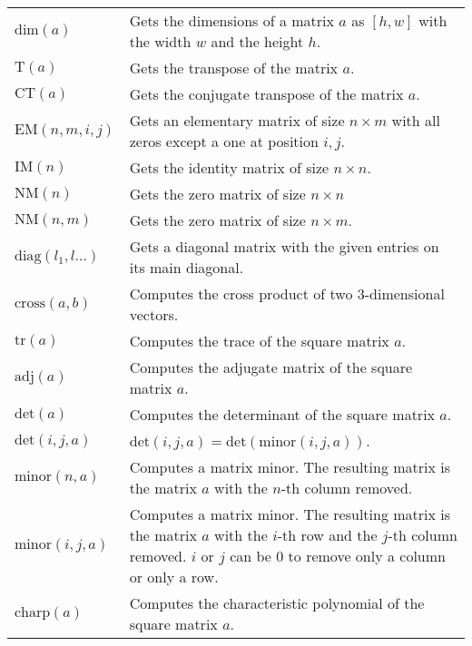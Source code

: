\documentclass[10pt]{article}
\begin{document}
\begin{longtable}{p{}p{}}
        $ \mathrm{dim}(a) $                        & Gets the dimensions of a matrix $ a $ as $ [ h, w ] $ with the width $ w $ and the height $ h $. \\
        $ \mathrm{T}(a) $                          & Gets the transpose of the matrix $ a $. \\
        $ \mathrm{CT}(a) $                         & Gets the conjugate transpose of the matrix $ a $. \\
        $ \mathrm{EM}(n,m,i,j) $                   & Gets an elementary matrix of size $ n \times m $ with all zeros except a one at position $ i, j $. \\
        $ \mathrm{IM}(n) $                         & Gets the identity matrix of size $ n \times n $. \\
        $ \mathrm{NM}(n) $                         & Gets the zero matrix of size $ n\times n $ \\
        $ \mathrm{NM}(n, m) $                      & Gets the zero matrix of size $ n\times m $. \\
        $ \mathrm{diag}(l_1,l\dots) $              & Gets a diagonal matrix with the given entries on its main diagonal. \\
        $ \mathrm{cross}(a, b) $                   & Computes the cross product of two $ 3 $-dimensional vectors. \\
        $ \mathrm{tr}(a) $                         & Computes the trace of the square matrix $ a $. \\
        $ \mathrm{adj}(a) $                        & Computes the adjugate matrix of the square matrix $ a $. \\
        $ \mathrm{det}(a) $                        & Computes the determinant of the square matrix $ a $. \\
        $ \mathrm{det}(i, j, a) $                  & $ \mathrm{det}(i, j, a) = \mathrm{det}(\mathrm{minor}(i, j, a)) $. \\
        $ \mathrm{minor}(n, a) $                   & Computes a matrix minor. The resulting matrix is the matrix $ a $ with the $ n $-th column removed. \\
        $ \mathrm{minor}(i, j, a) $                & Computes a matrix minor. The resulting matrix is the matrix $ a $ with the $ i $-th row and the $ j $-th column removed. $ i $ or $ j $ can be $ 0 $ to remove only a column or only a row. \\
        $ \mathrm{charp}(a) $                      & Computes the characteristic polynomial of the square matrix $ a $. \\

\end{longtable}
\end{document}

